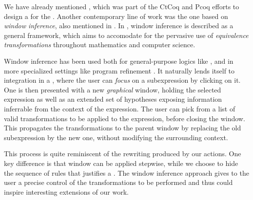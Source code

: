 We have already mentioned , which was part of the CtCoq and
Pcoq efforts  to design a  for the  . Another contemporary line of work was the
one based on \emph{window inference}, also mentioned in . In
, window inference is described as a general
 framework, which aims to accomodate for the pervasive use of
\emph{equivalence transformations} throughout mathematics and computer science.

Window inference has been used both for general-purpose logics like 
, and in more specialized settings like program
refinement . It naturally lends itself to
integration in a 
, where the user can
\emph{focus} on a subexpression by clicking on it. One is then presented with a
new \emph{graphical} window, holding the selected expression as well as an
extended set of hypotheses exposing information inferrable from the context of
the expression. The user can pick from a list of valid transformations to be
applied to the expression, before closing the window. This propagates the
transformations to the parent window by replacing the old subexpression by the
new one, without modifying the surrounding context.

This process is quite reminiscent of the rewriting produced by our 
actions. One key difference is that window  can be
applied stepwise, while we choose to hide the sequence of rules that
justifies a . The window inference approach gives to the user a
precise control of the transformations to be performed and thus could
inspire interesting extensions of our work.


